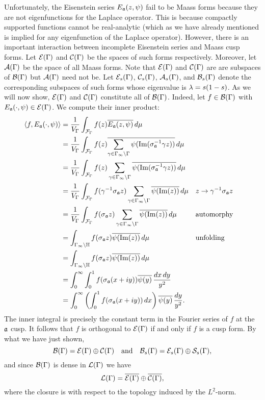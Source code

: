       Unfortunately, the Eisenstein series $E_{\mathfrak{a}}(z,\psi)$ fail to be Maass forms because they are not eigenfunctions for the Laplace operator. This is because compactly supported functions cannot be real-analytic (which as we have already mentioned is implied for any eigenfunction of the Laplace operator). However, there is an important interaction between incomplete Eisenstein series and Maass cusp forms. Let $\mathcal{E}(\Gamma)$ and $\mathcal{C}(\Gamma)$ be the spaces of such forms respectively. Moreover, let $\mathcal{A}(\Gamma)$ be the space of all Maass forms. Note that $\mathcal{E}(\Gamma)$ and $\mathcal{C}(\Gamma)$ are are subspaces of $\mathcal{B}(\Gamma)$ but $\mathcal{A}(\Gamma)$ need not be. Let $\mathcal{E}_{s}(\Gamma)$, $\mathcal{C}_{s}(\Gamma)$, $\mathcal{A}_{s}(\Gamma)$, and $\mathcal{B}_{s}(\Gamma)$ denote the corresponding subspaces of such forms whose eigenvalue is $\lambda = s(1-s)$. As we will now show, $\mathcal{E}(\Gamma)$ and $\mathcal{C}(\Gamma)$ constitute all of $\mathcal{B}(\Gamma)$. Indeed, let $f \in \mathcal{B}(\Gamma)$ with $E_{\mathfrak{a}}(\cdot,\psi) \in \mathcal{E}(\Gamma)$. We compute their inner product:
      \begin{align*}
        \langle f,E_{\mathfrak{a}}(\cdot,\psi)\rangle &= \frac{1}{V_{\Gamma}}\int_{\mathcal{F}_{\Gamma}}f(z)\overline{E_{\mathfrak{a}}(z,\psi)}\,d\mu \\
        &= \frac{1}{V_{\Gamma}}\int_{\mathcal{F}_{\Gamma}}f(z)\overline{\sum_{\gamma \in \Gamma_{\infty}\backslash\Gamma}\psi(\mathrm{Im}(\sigma_{\mathfrak{a}}^{-1}\gamma z))}\,d\mu \\
        &= \frac{1}{V_{\Gamma}}\int_{\mathcal{F}_{\Gamma}}f(z)\sum_{\gamma \in \Gamma_{\infty}\backslash\Gamma}\overline{\psi(\mathrm{Im}(\sigma_{\mathfrak{a}}^{-1}\gamma z))}\,d\mu \\
        &= \frac{1}{V_{\Gamma}}\int_{\mathcal{F}_{\Gamma}}f(\gamma^{-1}\sigma_{\mathfrak{a}}z)\sum_{\gamma \in \Gamma_{\infty}\backslash\Gamma}\overline{\psi(\mathrm{Im}(z))}\,d\mu && \text{$z \to \gamma^{-1}\sigma_{\mathfrak{a}}z$} \\
        &= \frac{1}{V_{\Gamma}}\int_{\mathcal{F}_{\Gamma}}f(\sigma_{\mathfrak{a}}z)\sum_{\gamma \in \Gamma_{\infty}\backslash\Gamma}\overline{\psi(\mathrm{Im}(z))}\,d\mu  && \text{automorphy} \\
        &= \int_{\Gamma_{\infty}\backslash\mathbb{H}}f(\sigma_{\mathfrak{a}}z)\overline{\psi(\mathrm{Im}(z))}\,d\mu && \text{unfolding} \\
        &= \int_{\Gamma_{\infty}\backslash\mathbb{H}}f(\sigma_{\mathfrak{a}}z)\overline{\psi(\mathrm{Im}(z))}\,d\mu \\
        &= \int_{0}^{\infty}\int_{0}^{1}f(\sigma_{\mathfrak{a}}(x+iy))\overline{\psi(y)}\,\frac{dx\,dy}{y^{2}} \\
        &= \int_{0}^{\infty}\left(\int_{0}^{1}f(\sigma_{\mathfrak{a}}(x+iy))\,dx\right)\overline{\psi(y)}\,\frac{dy}{y^{2}}.
      \end{align*}
      The inner integral is precisely the constant term in the Fourier series of $f$ at the $\mathfrak{a}$ cusp. It follows that $f$ is orthogonal to $\mathcal{E}(\Gamma)$ if and only if $f$ is a cusp form. By what we have just shown,
      \[
        \mathcal{B}(\Gamma) = \mathcal{E}(\Gamma) \oplus \mathcal{C}(\Gamma) \quad \text{and} \quad \mathcal{B}_{s}(\Gamma) = \mathcal{E}_{s}(\Gamma) \oplus \mathcal{S}_{s}(\Gamma),
      \]
      and since $\mathcal{B}(\Gamma)$ is dense in $\mathcal{L}(\Gamma)$ we have
      \[
        \mathcal{L}(\Gamma) = \overline{\mathcal{E}(\Gamma)} \oplus \overline{\mathcal{C}(\Gamma)},
      \]
      where the closure is with respect to the topology induced by the $L^{2}$-norm.
